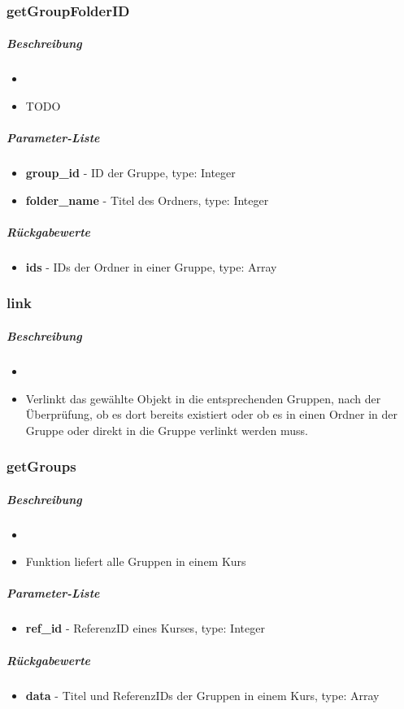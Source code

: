 \subsubsection*{getGroupFolderID}\label{getGroupFolderIDLGUI}
\subparagraph{Beschreibung}
\begin{itemize}
	\item[] \noindent{} 
	\item[] TODO
\end{itemize}
\subparagraph{Parameter-Liste}
\begin{itemize}
	\item[] \textbf{group\_id} - ID der Gruppe, type: Integer
	\item[] \textbf{folder\_name} - Titel des Ordners, type: Integer
\end{itemize}
\subparagraph{Rückgabewerte}
\begin{itemize}
	\item[] \textbf{ids} - IDs der Ordner in einer Gruppe, type: Array
\end{itemize}

\subsubsection*{link}\label{linkLGUI}
\subparagraph{Beschreibung}
\begin{itemize}
	\item[] \noindent{} 
	\item[] Verlinkt das gewählte Objekt in die entsprechenden Gruppen, nach der Überprüfung, ob es dort bereits existiert oder ob es in einen Ordner in der Gruppe oder direkt in die Gruppe verlinkt werden muss.
\end{itemize}

\subsubsection*{getGroups}\label{getGroupsLGUI}
\subparagraph{Beschreibung}
\begin{itemize}
	\item[] \noindent{} 
	\item[] Funktion liefert alle Gruppen in einem Kurs
\end{itemize}
\subparagraph{Parameter-Liste}
\begin{itemize}
	\item[] \textbf{ref\_id} - ReferenzID eines Kurses, type: Integer
\end{itemize}
\subparagraph{Rückgabewerte}
\begin{itemize}
	\item[] \textbf{data} - Titel und ReferenzIDs der Gruppen in einem Kurs, type: Array
\end{itemize}


